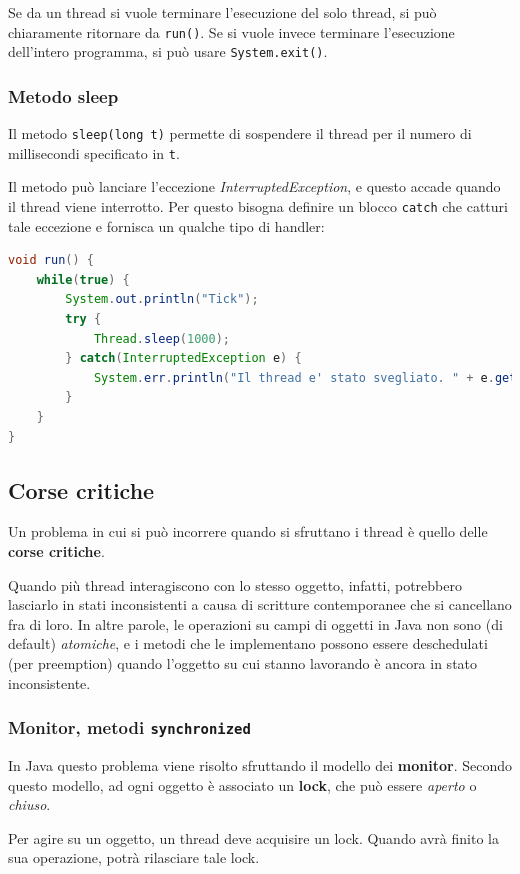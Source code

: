 \documentclass[a4paper,11pt]{article}
\begin{document}
Se da un thread si vuole terminare l'esecuzione del solo thread, si può chiaramente ritornare da \lstinline|run()|. Se si vuole invece terminare l'esecuzione dell'intero programma, si può usare \lstinline|System.exit()|. 

\subsubsection{Metodo sleep}
Il metodo \lstinline|sleep(long t)| permette di sospendere il thread per il numero di millisecondi specificato in \lstinline|t|.

Il metodo può lanciare l'eccezione \textit{InterruptedException}, e questo accade quando il thread viene interrotto.
Per questo bisogna definire un blocco \lstinline|catch| che catturi tale eccezione e fornisca un qualche tipo di handler:
\begin{lstlisting}[language=java, style=codestyle]	
void run() {
	while(true) {
		System.out.println("Tick");
		try {
			Thread.sleep(1000);
		} catch(InterruptedException e) {
			System.err.println("Il thread e' stato svegliato. " + e.getMessage());
		}
	}
}
\end{lstlisting}

\subsection{Corse critiche}
Un problema in cui si può incorrere quando si sfruttano i thread è quello delle \textbf{corse critiche}.

Quando più thread interagiscono con lo stesso oggetto, infatti, potrebbero lasciarlo in stati inconsistenti a causa di scritture contemporanee che si cancellano fra di loro.
In altre parole, le operazioni su campi di oggetti in Java non sono (di default) \textit{atomiche}, e i metodi che le implementano possono essere deschedulati (per preemption) quando l'oggetto su cui stanno lavorando è ancora in stato inconsistente.

\subsubsection{Monitor, metodi \lstinline|synchronized|}
In Java questo problema viene risolto sfruttando il modello dei \textbf{monitor}.
Secondo questo modello, ad ogni oggetto è associato un \textbf{lock}, che può essere \textit{aperto} o \textit{chiuso}.

Per agire su un oggetto, un thread deve acquisire un lock.
Quando avrà finito la sua operazione, potrà rilasciare tale lock.
\end{document}
